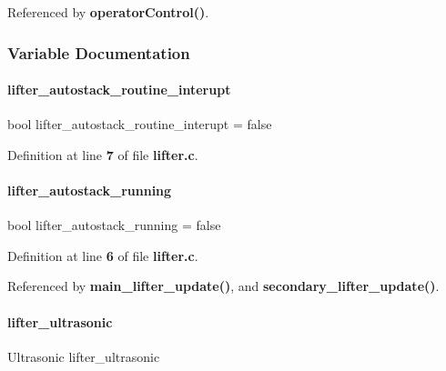 Referenced by \textbf{ operator\+Control()}.



\subsubsection{Variable Documentation}
\mbox{\label{lifter_8c_afbf11bb950aeb7975e91d0675a0820bc}} 
\paragraph{lifter\+\_\+autostack\+\_\+routine\+\_\+interupt}
{\footnotesize\ttfamily bool lifter\+\_\+autostack\+\_\+routine\+\_\+interupt = false\hspace{0.3cm}{\ttfamily [static]}}



Definition at line \textbf{ 7} of file \textbf{ lifter.\+c}.

\mbox{\label{lifter_8c_ae1fc3deab25f0b9e6f636bb83e9bf5c2}} 
\paragraph{lifter\+\_\+autostack\+\_\+running}
{\footnotesize\ttfamily bool lifter\+\_\+autostack\+\_\+running = false\hspace{0.3cm}{\ttfamily [static]}}



Definition at line \textbf{ 6} of file \textbf{ lifter.\+c}.



Referenced by \textbf{ main\+\_\+lifter\+\_\+update()}, and \textbf{ secondary\+\_\+lifter\+\_\+update()}.

\mbox{\label{lifter_8c_a5dfaf05eb7e97b2e29d04eb068f9c240}} 
\paragraph{lifter\+\_\+ultrasonic}
{\footnotesize\ttfamily Ultrasonic lifter\+\_\+ultrasonic}



